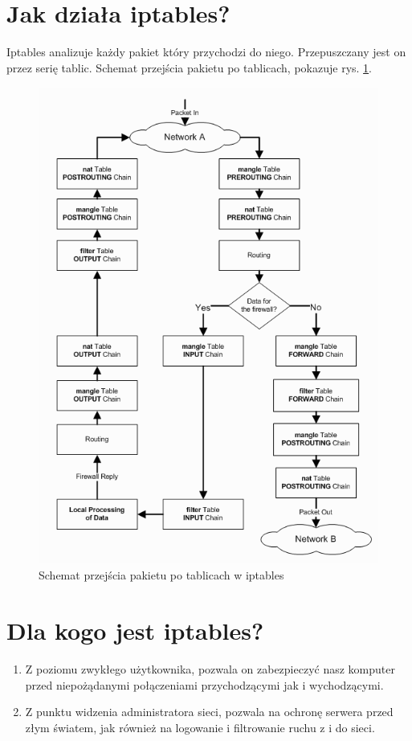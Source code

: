\documentclass[a4paper,12pt]{article}
\begin{document}
\section{Jak działa iptables?}
Iptables analizuje każdy pakiet który przychodzi do niego. Przepuszczany jest on przez serię tablic. Schemat przejścia pakietu po tablicach, pokazuje rys. \ref{fig:iptables_tablice}.
\begin{figure}
\includegraphics[scale=0.8]{iptables.png}
\caption{Schemat przejścia pakietu po tablicach w iptables}
\label{fig:iptables_tablice}
\end{figure}
\section{Dla kogo jest iptables?}
\begin{enumerate}
\item Z poziomu zwykłego użytkownika, pozwala on zabezpieczyć nasz komputer przed niepożądanymi połączeniami przychodzącymi jak i wychodzącymi.
\item Z punktu widzenia administratora sieci, pozwala na ochronę serwera przed złym światem, jak również na logowanie i filtrowanie ruchu z i do sieci.
\end{enumerate}
\end{document}
